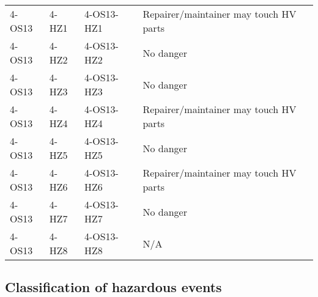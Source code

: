 \begin{center}
\begin{tabular}{l|l|l|l}
4-OS13		& 4-HZ1		& 4-OS13-HZ1	& Repairer/maintainer may touch HV parts \\
4-OS13		& 4-HZ2		& 4-OS13-HZ2	& No danger \\
4-OS13		& 4-HZ3		& 4-OS13-HZ3	& No danger \\
4-OS13		& 4-HZ4		& 4-OS13-HZ4	& Repairer/maintainer may touch HV parts \\
4-OS13		& 4-HZ5		& 4-OS13-HZ5	& No danger \\
4-OS13		& 4-HZ6		& 4-OS13-HZ6	& Repairer/maintainer may touch HV parts \\
4-OS13		& 4-HZ7		& 4-OS13-HZ7	& No danger \\
4-OS13		& 4-HZ8		& 4-OS13-HZ8	& N/A

\end{tabular}
\end{center}



\subsection{Classification of hazardous events}
%
%
%

